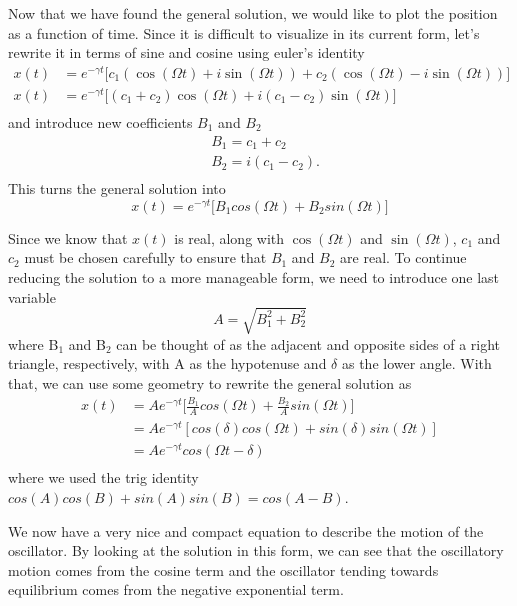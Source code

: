 \documentclass{article}
\newcommand{\be}{\begin{equation}}
\newcommand{\ee}{\end{equation}}
\begin{document}
Now that we have found the general solution, we would like to plot the position as a function of time. Since it is difficult to visualize in its current form, let's rewrite it in terms of sine and cosine using euler's identity
\be
\begin{split}
x(t) &= e^{-\gamma t} \big[ c_1(\cos(\Omega t) + i \sin(\Omega t)) + c_2(\cos(\Omega t) - i \sin(\Omega t)) \big] \\
x(t) &= e^{-\gamma t} \big[ (c_1 + c_2)\cos(\Omega t) + i(c_1 - c_2)\sin(\Omega t) \big] \\
\end{split}
\ee
and introduce new coefficients $B_1$ and $B_2$
\be
\begin{split}
&B_1 = c_1 + c_2 \\
&B_2 = i(c_1 - c_2) . \\
\end{split}
\ee
This turns the general solution into
\be
x(t) = e^{-\gamma t} \big[ B_1 cos(\Omega t) + B_2 sin(\Omega t)]
\ee

Since we know that $x(t)$ is real, along with $\cos(\Omega t)$ and $\sin(\Omega t)$, $c_1$ and $c_2$ must be chosen carefully to ensure that $B_1$ and $B_2$ are real. To continue reducing the solution to a more manageable form, we need to introduce one last variable
\be
A = \sqrt{B_1^2 + B_2^2}
\ee
where B$_1$ and B$_2$ can be thought of as the adjacent and opposite sides of a right triangle, respectively, with A as the hypotenuse and $\delta$ as the lower angle.
With that, we can use some geometry to rewrite the general solution as
\be
\begin{split}
x(t) &= Ae^{-\gamma t} \Big[\frac{B_1}{A}cos(\Omega t) + \frac{B_2}{A}sin(\Omega t) \Big]\\
 &= Ae^{-\gamma t} [cos(\delta)cos(\Omega t) + sin(\delta)sin(\Omega t)]\\
 &= Ae^{-\gamma t} cos(\Omega t - \delta)\\
\end{split}
\ee
where we used the trig identity $cos(A)cos(B) + sin(A)sin(B) = cos(A-B)$.

We now have a very nice and compact equation to describe the motion of the oscillator.
By looking at the solution in this form, we can see that the oscillatory motion comes from the cosine term and the oscillator tending towards equilibrium comes from the negative exponential term.
\end{document}
